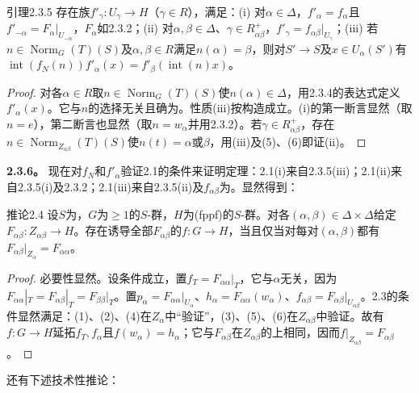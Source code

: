 \begin{SGAresult}{引理}{2.3.5}
存在族$f'_\gamma:U_\gamma\to H$（$\gamma\in R$），满足：(i) 对$\alpha\in\Delta$，$f'_\alpha=f_\alpha$且$f'_{-\alpha}=F_\alpha|_{U_{-\alpha}}$，$F_\alpha$如2.3.2；(ii) 对$\alpha,\beta\in\Delta$、$\gamma\in R^+_{\alpha\beta}$，$f'_\gamma=f_{\alpha\beta}|_{U_\gamma}$；(iii) 若$n\in\operatorname{Norm}_G(T)(S)$及$\alpha,\beta\in R$满足$n(\alpha)=\beta$，则对$S'\to S$及$x\in U_\alpha(S')$有$\operatorname{int}(f_N(n))f'_\alpha(x)=f'_\beta(\operatorname{int}(n)x)$。
\end{SGAresult}
\begin{proof}
对各$\alpha\in R$取$n\in\operatorname{Norm}_G(T)(S)$使$n(\alpha)\in\Delta$，用2.3.4的表达式定义$f'_\alpha(x)$。它与$n$的选择无关且确为。性质(iii)按构造成立。(i)的第一断言显然（取$n=e$），第二断言也显然（取$n=w_\alpha$并用2.3.2）。若$\gamma\in R^+_{\alpha\beta}$，存在$n\in\operatorname{Norm}_{Z_{\alpha\beta}}(T)(S)$使$n(t)=\alpha$或$\beta$，用(iii)及(5)、(6)即证(ii)。
\end{proof}
\textbf{2.3.6。} 现在对$f_N$和$f'_\alpha$验证2.1的条件来证明定理：2.1(i)来自2.3.5(iii)；2.1(ii)来自2.3.5(i)及2.3.2；2.1(iii)来自2.3.5(ii)及$f_{\alpha\beta}$为。显然得到：
\begin{SGAresult}{推论}{2.4}
设$S$为，$G$为$\geq1$的$S$-群，$H$为(fppf)的$S$-群。对各$(\alpha,\beta)\in\Delta\times\Delta$给定$F_{\alpha\beta}:Z_{\alpha\beta}\to H$。存在诱导全部$F_{\alpha\beta}$的$f:G\to H$，当且仅当对每对$(\alpha,\beta)$都有$F_{\alpha\beta}|_{Z_\alpha}=F_{\alpha\alpha}$。
\end{SGAresult}
\begin{proof}
必要性显然。设条件成立，置$f_T=F_{\alpha\alpha}|_T$，它与$\alpha$无关，因为$F_{\alpha\alpha}|_T=F_{\alpha\beta}|_T=F_{\beta\beta}|_T$。置$p_\alpha=F_{\alpha\alpha}|_{U_\alpha}$、$h_\alpha=F_{\alpha\alpha}(w_\alpha)$、$f_{\alpha\beta}=F_{\alpha\beta}|_{U_{\alpha\beta}}$。2.3的条件显然满足：(1)、(2)、(4)在$Z_\alpha$中“验证”，(3)、(5)、(6)在$Z_{\alpha\beta}$中验证。故有$f:G\to H$延拓$f_T,f_\alpha$且$f(w_\alpha)=h_\alpha$；它与$F_{\alpha\beta}$在$Z_{\alpha\beta}$的上相同，因而$f|_{Z_{\alpha\beta}}=F_{\alpha\beta}$。
\end{proof}
还有下述技术性推论：
